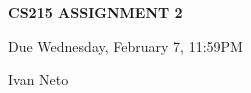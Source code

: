 \documentclass{article}
\begin{document}
\rhead{\thepage}



\pagestyle{fancy}

\cfoot{}

\begin{center}

\large{\textbf{CS215 ASSIGNMENT 2}}

Due Wednesday, February 7, 11:59PM

Ivan Neto

\end{center}

\vskip 0.2in





\newpage





\newpage


\end{document}
